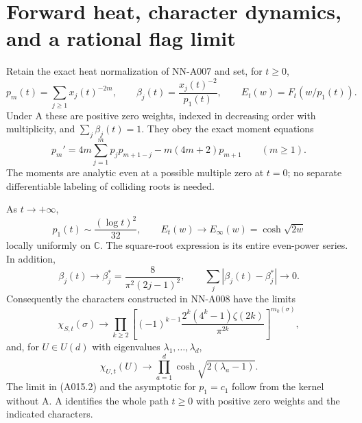 \section{Forward heat, character dynamics, and a rational flag limit}

\begin{theorem}
Retain the exact heat normalization of NN-A007 and set, for $t\ge0$,
\[
 p_m(t)=\sum_{j\ge1}x_j(t)^{-2m},\qquad
 \beta_j(t)=\frac{x_j(t)^{-2}}{p_1(t)},\qquad
 E_t(w)=F_t(w/p_1(t)).
\]
Under A these are positive zero weights, indexed in decreasing order
with multiplicity, and $\sum_j\beta_j(t)=1$. They obey the exact
moment equations
\[
 p_m'=4m\sum_{j=1}^{m}p_jp_{m+1-j}-m(4m+2)p_{m+1}
 \qquad(m\ge1).                                      \tag{A015.1}
\]
The moments are analytic even at a possible multiple zero at $t=0$;
no separate differentiable labeling of colliding roots is needed.

As $t\to+\infty$,
\[
 p_1(t)\sim\frac{(\log t)^2}{32},\qquad
 E_t(w)\longrightarrow E_\infty(w)=\cosh\sqrt{2w}
                                                        \tag{A015.2}
\]
locally uniformly on $\mathbb C$. The square-root expression is its
entire even-power series. In addition,
\[
 \beta_j(t)\longrightarrow
 \beta_j^*=\frac{8}{\pi^2(2j-1)^2},\qquad
 \sum_j|\beta_j(t)-\beta_j^*|\longrightarrow0.           \tag{A015.3}
\]
Consequently the characters constructed in NN-A008 have the limits
\[
 \chi_{S,t}(\sigma)\longrightarrow
 \prod_{k\ge2}\left[
 (-1)^{k-1}\frac{2^k(4^k-1)\zeta(2k)}{\pi^{2k}}
 \right]^{m_k(\sigma)},                                \tag{A015.4}
\]
and, for $U\in U(d)$ with eigenvalues $\lambda_1,\ldots,\lambda_d$,
\[
 \chi_{U,t}(U)\longrightarrow
 \prod_{a=1}^d\cosh\sqrt{2(\lambda_a-1)}.                \tag{A015.5}
\]
The limit in (A015.2) and the asymptotic for $p_1=c_1$ follow from
the kernel without A. A identifies the whole path $t\ge0$ with
positive zero weights and the indicated characters.
\end{theorem}

